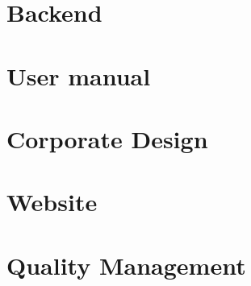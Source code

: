 \section{Backend}
%










\section{User manual}

\section{Corporate Design}
%
\section{Website}
%

\section{Quality Management}
